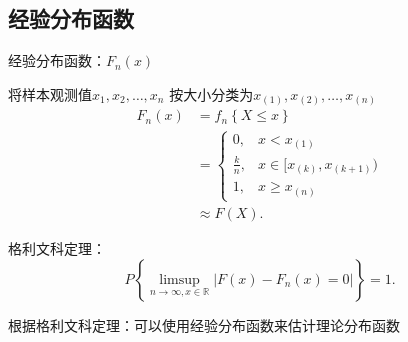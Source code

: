 \subsection{经验分布函数}%
\label{sub:经验分布函数}
经验分布函数：$F_n\left( x \right) $

将样本观测值$x_1,x_2,\ldots ,x_n$ 按大小分类为$x_{\left( 1 \right)} ,x_{\left( 2 \right)} ,\ldots ,x_{\left( n \right) }$
\begin{align*}
    F_n\left( x \right) &=f_n\left\{ X\le x \right\} \\
    &= \begin{cases}
        0,&x<x_{\left( 1 \right) }\\
        \frac{k}{n} ,&x\in [x_{\left( k \right) },x_{\left( k+1 \right) })\\
        1,&x\ge x_{\left( n \right) }
    \end{cases}\\
    &\approx F\left( X \right) 
.\end{align*}
\begin{cor}
    格利文科定理：\[
        P\left\{ \limsup_{n \to \infty,x\in \mathbb{R}} \left| F\left( x \right) -F_n\left( x \right) =0 \right|  \right\} =1
    .\] 
\end{cor}
根据格利文科定理：可以使用经验分布函数来估计理论分布函数
